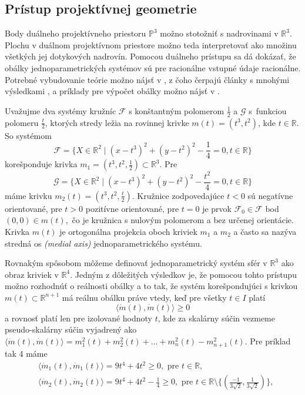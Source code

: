 \subsection{Prístup projektívnej geometrie}
Body duálneho projektívneho priestoru $\mathbb{P}^3 $ možno stotožniť s nadrovinami v $\mathbb{R}^3$. Plochu v duálnom projektívnom priestore možno teda interpretovať ako množinu všetkých jej dotykových nadrovín. Pomocou duálneho prístupu sa dá dokázať, že obálky jednoparametrických systémov sú pre racionálne vstupné údaje racionálne. Potrebné vybudovanie teórie možno nájsť v \cite{Pott01}, z čoho čerpajú články s mnohými výsledkami \cite{Pet08}, \cite{Pet98} a príklady pre výpočet obálky možno nájsť v \cite{Vra22}.
\begin{example}
Uvažujme dva systémy kružníc $\mathcal{F}$ s konštantným polomerom $\frac{1}{2}$ a $\mathcal{G}$ s~funkciou polomeru $\frac{t}{2}$, ktorých stredy ležia na rovinnej krivke $m(t) = (t^3, t^2)$, kde $t \in \mathbb{R}.$
So systémom
$$ \mathcal{F} = \{ X \in \mathbb{R}^2 \mid (x - t^3)^2 + (y - t^2)^2 - \frac{1}{4} = 0, t \in \mathbb{R} \}$$
korešponduje krivka $m_1 = (t^3, t^2, \frac{1}{2})\subset \mathbb{R}^3$.
Pre
$$ \mathcal{G} = \{ X \in \mathbb{R}^2 \mid (x - t^3)^2 + (y - t^2)^2 - \frac{t^2}{4} = 0, t \in \mathbb{R} \}$$
máme krivku $m_2(t) = (t^3, t^2, \frac{t}{2}).$
Kružnice zodpovedajúce $t < 0$ sú negatívne orientované, pre $t > 0$ pozitívne orientované, pre $t = 0$ je prvok $\mathcal{F}_0 \in \mathcal{F}$ bod $ (0, 0) \in m(t), $ čo je kružnica s nulovým polomerom a bez určenej orientácie.
Krivka $m(t)$ je ortogonálna projekcia oboch kriviek $m_1$ a $m_2$ a často sa nazýva stredná os \textit{(medial axis)} jednoparametrického systému.
\end{example}
Rovnakým spôsobom môžeme definovať jednoparametrický systém sfér v $\mathbb{R}^3$ ako obraz kriviek v $\mathbb{R}^4$.
Jedným z dôležitých výsledkov je, že pomocou tohto prístupu možno rozhodnúť o reálnosti obálky a to tak, že systém korešpondujúci s krivkou $m(t) \subset \mathbb{R}^{n+1}$ má reálnu obálku práve vtedy, keď pre všetky $t \in I $ platí 
$$\langle \dot{m}(t), \dot{m}(t) \rangle \geq 0$$ 
a rovnosť platí len pre izolované hodnoty $t$, kde za skalárny súčin vezmeme pseudo-skalárny súčin vyjadrený ako $\langle \dot{m}(t), \dot{m}(t) \rangle = m_1^2(t) + m_2^2(t) + \ldots + m_n^2(t) - m_{n+1}^2(t).$
Pre príklad tak 4 máme
\begin{align*}
&\langle \dot{m}_1(t), \dot{m}_1(t) \rangle = 9t^4 + 4t^2 \geq 0, \text{ pre } t \in \mathbb{R}, \\
&\langle \dot{m}_2(t), \dot{m}_2(t) \rangle = 9t^4 + 4t^2 - \frac{1}{4} \geq 0, \text{ pre } t \in \mathbb{R} \setminus \{ (\frac{-1}{3 \sqrt{2}}, \frac{1}{3 \sqrt{2}}) \},
\end{align*}
